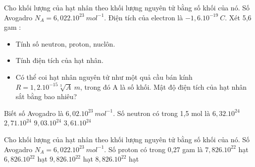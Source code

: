 \begin{vidu}
	Cho khối lượng của hạt nhân theo khối lượng nguyên tử bằng số khối của nó. Số Avogadro $N_A=6,022.10^{23}\ mol^{-1}$. Điện tích của electron là $-1,6.10^{-19}\ C$. Xét 5,6 gam :
	\begin{itemize}
	\item[a)] Tính số neutron, proton, nuclôn.
	\item[b)] Tính điện tích của hạt nhân. 
	\item[c)] Có thể coi hạt nhân nguyên tử như một quả cầu bán kính $R = 1,2.10^{- 15}\sqrt[3]{A}\ m$, trong đó A là số khối. Mật độ điện tích của hạt nhân sắt  bằng bao nhiêu?
\end{itemize}
\end{vidu}
	\begin{vidu}%
	 Biết số Avogadro là $6,02.10^{23}\ mol^{-1}$. Số neutron có trong 1,5 mol  là
	\choice
	{$6,32.10^{24}$}
	{$2,71.10^{24}$}
	{$9,03.10^{24}$}
	{\True $3,61.10^{24}$}
\end{vidu}
\begin{vidu}%
	Cho khối lượng của hạt nhân theo khối lượng nguyên tử bằng số khối của nó. Số Avogadro $N_A=6,022.10^{23}\ mol^{-1}$. Số proton có trong 0,27 gam  là
	\choice
	{\True $7,826.10^{22}$ hạt}
	{$6,826.10^{22}$ hạt}
	{$9,826.10^{22}$ hạt}
	{$8,826.10^{22}$ hạt}
\end{vidu}
